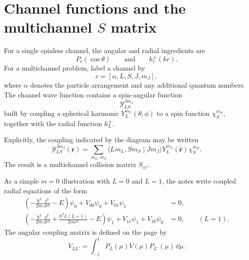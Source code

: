 \section{Channel functions and the multichannel \texorpdfstring{$S$}{S} matrix}
For a single spinless channel, the angular and radial ingredients are
\[
  P_\ell(\cos\theta)
  \qquad\text{and}\qquad
  h_\ell^\pm(kr).
\]
For a multichannel problem, label a channel by
\begin{equation}
  c=[\alpha,L,S,J,m_J],
  \label{eq:res-channel-label}
\end{equation}
where $\alpha$ denotes the particle arrangement and any additional quantum numbers.  The channel wave function contains a spin-angular function
\[
  \mathcal{Y}_{LS}^{Jm_J}
\]
built by coupling a spherical harmonic $Y_L^{m_L}(\theta,\phi)$ to a spin function $\chi_S^{m_S}$, together with the radial function $h_L^\pm$.

Explicitly, the coupling indicated by the diagram may be written
\begin{equation}
  \mathcal{Y}_{LS}^{Jm_J}(\widehat{\bm r})
  =\sum_{m_L,m_S}
  \langle Lm_L,Sm_S\mid Jm_J\rangle
  Y_L^{m_L}(\widehat{\bm r})\chi_S^{m_S}.
  \label{eq:res-spin-angular-function}
\end{equation}
The result is a multichannel collision matrix $S_{cc'}$.

As a simple $m=0$ illustration with $L=0$ and $L=1$, the notes write coupled radial equations of the form
\begin{align}
  \left(-\frac{\hbar^2}{2m}\frac{\dd^2}{\dd r^2}-E\right)\psi_0
  +V_{00}\psi_0+V_{01}\psi_1&=0,
  \label{eq:res-coupled-l0}\\
  \left(-\frac{\hbar^2}{2m}\frac{\dd^2}{\dd r^2}
  +\frac{\hbar^2L(L+1)}{2mr^2}-E\right)\psi_1
  +V_{11}\psi_1+V_{10}\psi_0&=0,
  \qquad (L=1).
  \label{eq:res-coupled-l1}
\end{align}
The angular coupling matrix is defined on the page by
\begin{equation}
  V_{LL'}
  =\int_{-1}^{1}P_L(\mu)V(\mu)P_{L'}(\mu)\,\dd\mu.
  \label{eq:res-angular-potential-matrix}
\end{equation}
